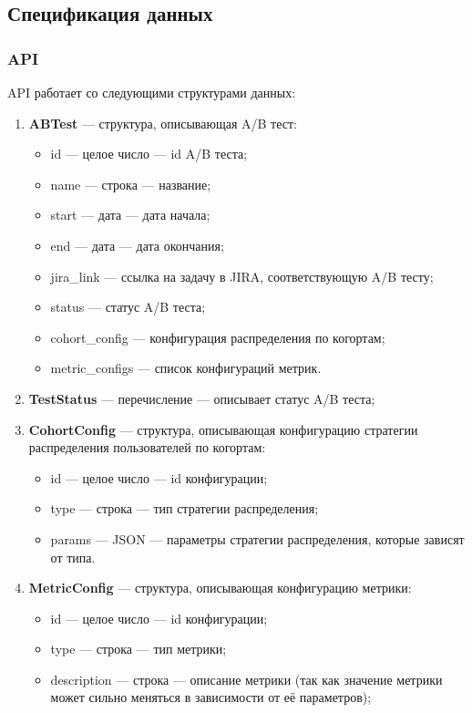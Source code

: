 \documentclass[../document.tex]{subfiles}
\begin{document}
	\subsection{Спецификация данных}
	\subsubsection{API}
	\par API работает со следующими структурами данных:
	\begin{enumerate}
		\item \textbf{ABTest} --- структура, описывающая A/B тест:
		\begin{itemize}
			\item id --- целое число --- id A/B теста;
			\item name --- строка --- название;
			\item start --- дата --- дата начала;
			\item end --- дата --- дата окончания;
			\item jira\_link --- ссылка на задачу в JIRA, соответствующую A/B тесту;
			\item status --- статус A/B теста;
			\item cohort\_config --- конфигурация распределения по когортам;
			\item metric\_configs --- список конфигураций метрик.
		\end{itemize}
		\item \textbf{TestStatus} --- перечисление --- описывает статус A/B теста;
		\item \textbf{CohortConfig} --- структура, описывающая конфигурацию стратегии распределения пользователей по когортам:
		\begin{itemize}
			\item id --- целое число --- id конфигурации;
			\item type --- строка --- тип стратегии распределения;
			\item params --- JSON --- параметры стратегии распределения, которые зависят от типа.
		\end{itemize}
		\item \textbf{MetricConfig} --- структура, описывающая конфигурацию метрики:
		\begin{itemize}
			\item id --- целое число --- id конфигурации;
			\item type --- строка --- тип метрики;
			\item description --- строка --- описание метрики (так как значение метрики может сильно меняться в зависимости от её параметров);

\end{itemize}
\end{enumerate}
\end{document}
